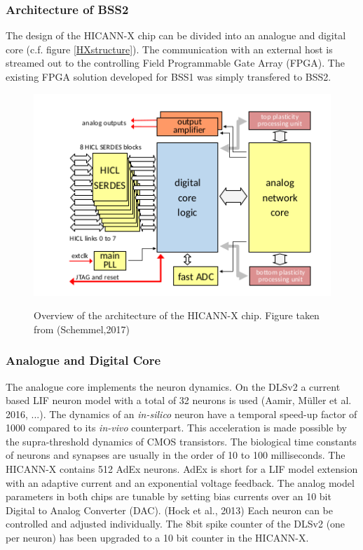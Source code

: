 \subsubsection{Architecture of BSS2}

The design of the HICANN-X chip can be divided into an analogue and digital core (c.f. figure \ref{HXstructure}). The communication with an external host is streamed out to the controlling Field Programmable Gate Array (FPGA). The existing FPGA solution developed for BSS1 was simply transfered to BSS2.

\begin{figure}
\includegraphics{figures/HXstructure.png}
\label{hxstructure}
\caption{Overview of the architecture of the HICANN-X chip. Figure taken from (Schemmel,2017)}
\end{figure}


\subsubsection*{Analogue and Digital Core}
The analogue core implements the neuron dynamics. On the DLSv2 a current based LIF neuron model with a total of 32 neurons is used (Aamir, Müller et al. 2016, ...). The dynamics of an \textit{in-silico} neuron have a temporal speed-up factor of 1000 compared to its \textit{in-vivo} counterpart. This acceleration is made possible by the supra-threshold dynamics of CMOS transistors. The biological time constants of neurons and synapses are usually in the order of 10 to 100 milliseconds. The HICANN-X contains 512 AdEx neurons. AdEx is short for a LIF model extension with an adaptive current and an exponential voltage feedback. The analog model parameters in both chips are tunable by setting bias currents over an 10 bit Digital to Analog Converter (DAC). (Hock et al., 2013) Each neuron can be controlled and adjusted individually. The 8bit spike counter of the DLSv2 (one per neuron) has been upgraded to a 10 bit counter in the HICANN-X. 

